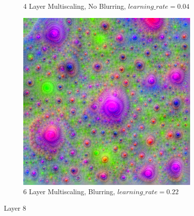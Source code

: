 \begin{figure}
\begin{subfigure}[t]{0.31\textwidth}
        \caption{4 Layer Multiscaling, No Blurring, \(learning\_rate = 0.04\)}
    \end{subfigure}
    \hfill
    \begin{subfigure}[t]{0.31\textwidth}
        \captionsetup{justification=centering}
        \centering
        \includegraphics[width=.7\linewidth]{figuras/feat_vis/experiments/layers/intermediary/l8/random_image_pl6_lr2.2e-1_layer17.png}
        \caption{6 Layer Multiscaling, Blurring, \(learning\_rate = 0.22\)}
    \end{subfigure}

    \caption{Layer 8}
    \label{fig:layer_8}
\end{figure}


